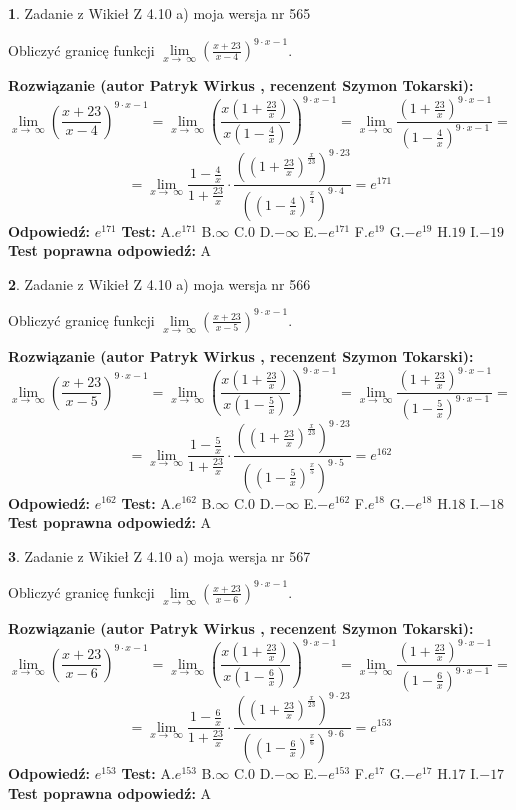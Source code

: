 \documentclass[12pt, a4paper]{article}
\theoremstyle{definition} %
\newtheorem{zad}{}
\newcommand{\zadStart}[1]{\begin{zad}#1\newline}
\newcommand{\zadStop}{\end{zad}}
\newcommand{\rozwStart}[2]{\noindent \textbf{Rozwiązanie (autor #1 , recenzent #2): }\newline}
\newcommand{\rozwStop}{\newline}
\newcommand{\odpStart}{\noindent \textbf{Odpowiedź:}\newline}
\newcommand{\odpStop}{\newline}
\newcommand{\testStart}{\noindent \textbf{Test:}\newline}
\newcommand{\testStop}{\newline}
\newcommand{\kluczStart}{\noindent \textbf{Test poprawna odpowiedź:}\newline}
\newcommand{\kluczStop}{\newline}
\begin{document}
\zadStart{Zadanie z Wikieł Z 4.10 a) moja wersja nr 565}

Obliczyć granicę funkcji  $\lim\limits_{x\to\ \infty}(\frac{x+23}{x-4})^{9\cdot x-1}$.
\zadStop
\rozwStart{Patryk Wirkus}{Szymon Tokarski}
$$\lim\limits_{x\to\ \infty}(\frac{x+23}{x-4})^{9\cdot x-1} = \lim\limits_{x\to\ \infty}(\frac{x(1+\frac{23}{x})}{x(1-\frac{4}{x})})^{9\cdot x-1}=\lim\limits_{x\to\ \infty}\frac{(1+\frac{23}{x})^{9\cdot x-1}}{(1-\frac{4}{x})^{9\cdot x-1}}=$$
$$=\lim\limits_{x\to\ \infty}\frac{1-\frac{4}{x}}{1+\frac{23}{x}}\cdot\frac{((1+\frac{23}{x})^{\frac{x}{23}})^{9\cdot23}}{((1-\frac{4}{x})^{\frac{x}{4}})^{9\cdot4}}=e^{171}$$
\rozwStop
\odpStart
$e^{171}$
\odpStop
\testStart
A.$e^{171}$ B.$\infty$ C.$0$ D.$-\infty$ E.$-e^{171}$
F.$e^{19}$ G.$-e^{19}$
H.$19$
I.$-19$
\testStop
\kluczStart
A
\kluczStop



\zadStart{Zadanie z Wikieł Z 4.10 a) moja wersja nr 566}

Obliczyć granicę funkcji  $\lim\limits_{x\to\ \infty}(\frac{x+23}{x-5})^{9\cdot x-1}$.
\zadStop
\rozwStart{Patryk Wirkus}{Szymon Tokarski}
$$\lim\limits_{x\to\ \infty}(\frac{x+23}{x-5})^{9\cdot x-1} = \lim\limits_{x\to\ \infty}(\frac{x(1+\frac{23}{x})}{x(1-\frac{5}{x})})^{9\cdot x-1}=\lim\limits_{x\to\ \infty}\frac{(1+\frac{23}{x})^{9\cdot x-1}}{(1-\frac{5}{x})^{9\cdot x-1}}=$$
$$=\lim\limits_{x\to\ \infty}\frac{1-\frac{5}{x}}{1+\frac{23}{x}}\cdot\frac{((1+\frac{23}{x})^{\frac{x}{23}})^{9\cdot23}}{((1-\frac{5}{x})^{\frac{x}{5}})^{9\cdot5}}=e^{162}$$
\rozwStop
\odpStart
$e^{162}$
\odpStop
\testStart
A.$e^{162}$ B.$\infty$ C.$0$ D.$-\infty$ E.$-e^{162}$
F.$e^{18}$ G.$-e^{18}$
H.$18$
I.$-18$
\testStop
\kluczStart
A
\kluczStop



\zadStart{Zadanie z Wikieł Z 4.10 a) moja wersja nr 567}

Obliczyć granicę funkcji  $\lim\limits_{x\to\ \infty}(\frac{x+23}{x-6})^{9\cdot x-1}$.
\zadStop
\rozwStart{Patryk Wirkus}{Szymon Tokarski}
$$\lim\limits_{x\to\ \infty}(\frac{x+23}{x-6})^{9\cdot x-1} = \lim\limits_{x\to\ \infty}(\frac{x(1+\frac{23}{x})}{x(1-\frac{6}{x})})^{9\cdot x-1}=\lim\limits_{x\to\ \infty}\frac{(1+\frac{23}{x})^{9\cdot x-1}}{(1-\frac{6}{x})^{9\cdot x-1}}=$$
$$=\lim\limits_{x\to\ \infty}\frac{1-\frac{6}{x}}{1+\frac{23}{x}}\cdot\frac{((1+\frac{23}{x})^{\frac{x}{23}})^{9\cdot23}}{((1-\frac{6}{x})^{\frac{x}{6}})^{9\cdot6}}=e^{153}$$
\rozwStop
\odpStart
$e^{153}$
\odpStop
\testStart
A.$e^{153}$ B.$\infty$ C.$0$ D.$-\infty$ E.$-e^{153}$
F.$e^{17}$ G.$-e^{17}$
H.$17$
I.$-17$
\testStop
\kluczStart
A
\kluczStop
\end{document}
